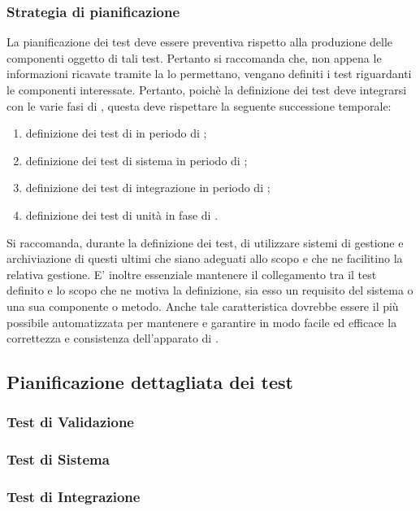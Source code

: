 \documentclass[12pt,a4paper]{article}
\begin{document}
\subsubsection{Strategia di pianificazione}
La pianificazione dei test deve essere preventiva rispetto alla produzione delle componenti oggetto di tali test. Pertanto si raccomanda che, non appena le informazioni ricavate tramite la  lo permettano, vengano definiti i test riguardanti le componenti interessate.
Pertanto, poichè la definizione dei test deve integrarsi con le varie fasi di , questa deve rispettare la seguente successione temporale:
\begin{enumerate}
	\item definizione dei test di   in periodo di \FA;
	\item definizione dei test di sistema in periodo di \FAD;
	\item definizione dei test di integrazione in periodo di \FPA;
	\item definizione dei test di unità in fase di \FPD.
	\end{enumerate}
Si raccomanda, durante la definizione dei test, di utilizzare sistemi di gestione e archiviazione di questi ultimi che siano adeguati allo scopo e che ne facilitino la relativa gestione. E' inoltre essenziale mantenere il collegamento tra il test definito e lo scopo che ne motiva la definizione, sia esso un requisito del sistema o una sua componente o metodo. Anche tale caratteristica dovrebbe essere il più possibile automatizzata per mantenere e garantire in modo facile ed efficace la correttezza e consistenza dell'apparato di .

\subsection{Pianificazione dettagliata dei test}\label{test_pianificazione}
\subsubsection{Test di Validazione}\label{test_validazione}
\subsubsection{Test di Sistema}\label{test_sistema}
\subsubsection{Test di Integrazione}\label{test_integrazione}
\end{document}
